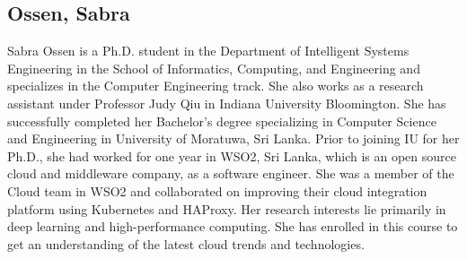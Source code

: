 \subsection{Ossen, Sabra}
Sabra Ossen is a Ph.D. student in the Department of Intelligent Systems Engineering in the School of Informatics, Computing, and Engineering and specializes in the Computer Engineering track. She also works as a research assistant under Professor Judy Qiu in Indiana University Bloomington. She has successfully completed her Bachelor’s degree specializing in Computer Science and Engineering in University of Moratuwa, Sri Lanka. Prior to joining IU for her Ph.D., she had worked for one year in WSO2, Sri Lanka, which is an open source cloud and middleware company, as a software engineer. She was a member of the Cloud team in WSO2 and collaborated on improving their cloud integration platform using Kubernetes and HAProxy. Her research interests lie primarily in deep learning and high-performance computing. She has enrolled in this course to get an understanding of the latest cloud trends and technologies.
